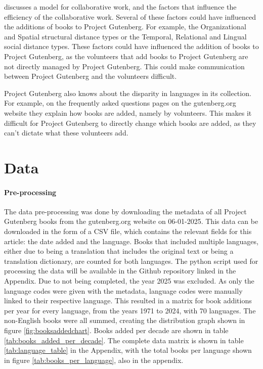 \documentclass[11pt]{article}
\begin{document}
\textcite{pallot_collaborative_2010} discusses a model for collaborative work, and the factors that influence the efficiency of the collaborative work. Several of these factors could have influenced the additions of books to Project Gutenberg. For example, the Organizational and Spatial structural distance types or the Temporal, Relational and Lingual social distance types. These factors could have influenced the addition of books to Project Gutenberg, as the volunteers that add books to Project Gutenberg are not directly managed by Project Gutenberg. This could make communication between Project Gutenberg and the volunteers difficult.

Project Gutenberg also knows about the disparity in languages in its collection. For example, on the frequently asked questions pages on the gutenberg.org website they explain how books are added, namely by volunteers. This makes it difficult for Project Gutenberg to directly change which books are added, as they can't dictate what these volunteers add.

\section{Data}
\paragraph{Pre-processing}
The data pre-processing was done by downloading the metadata of all Project Gutenberg books from the gutenberg.org website on 06-01-2025. This data can be downloaded in the form of a CSV file, which contains the relevant fields for this article: the date added and the language. 
Books that included multiple languages, either due to being a translation that includes the original text or being a translation dictionary, are counted for both languages. The python script used for processing the data will be available in the Github repository linked in the Appendix. Due to not being completed, the year 2025 was excluded. 
As only the language codes were given with the metadata, language codes were manually linked to their respective language. 
This resulted in a matrix for book additions per year for every language, from the years 1971 to 2024, with 70 languages. The non-English books were all summed, creating the distribution graph shown in figure \ref{fig:booksaddedchart}. Books added per decade are shown in table \ref{tab:books_added_per_decade}. The complete data matrix is shown in table \ref{tab:language_table} in the Appendix, with the total books per language shown in figure \ref{tab:books_per_language}, also in the appendix.
\end{document}
